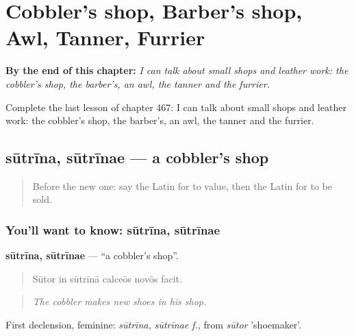 
\chapter{Cobbler's shop, Barber's shop, Awl, Tanner, Furrier}
\label{ch:la-cobbler-s-shop-barber-s-shop-awl-tanner-furrier}

\begin{chapteropening}
\textbf{By the end of this chapter:} \emph{I can talk about small shops and leather work: the cobbler's shop, the barber's, an awl, the tanner and the furrier.}

Complete the last lesson of chapter 467: I can talk about small shops and leather work: the cobbler's shop, the barber's, an awl, the tanner and the furrier.
\end{chapteropening}

\section[sūtrīna, sūtrīnae]{sūtrīna, sūtrīnae — a cobbler's shop}

\label{lesson:LA-C467-sutrina}



\begin{quote}
Before the new one: say the Latin for to value, then the Latin for to be sold.
\end{quote}

\subsection*{You'll want to know: sūtrīna, sūtrīnae}
\textbf{sūtrīna, sūtrīnae} — \textquotedblleft{}a cobbler's shop\textquotedblright{}.

\begin{quote}
Sūtor in sūtrīnā calceōs novōs facit.
\end{quote}

\begin{quote}
\emph{The cobbler makes new shoes in his shop.}
\end{quote}

First declension, feminine: \emph{sūtrīna, sūtrīnae f.}, from \emph{sūtor} 'shoemaker'.

